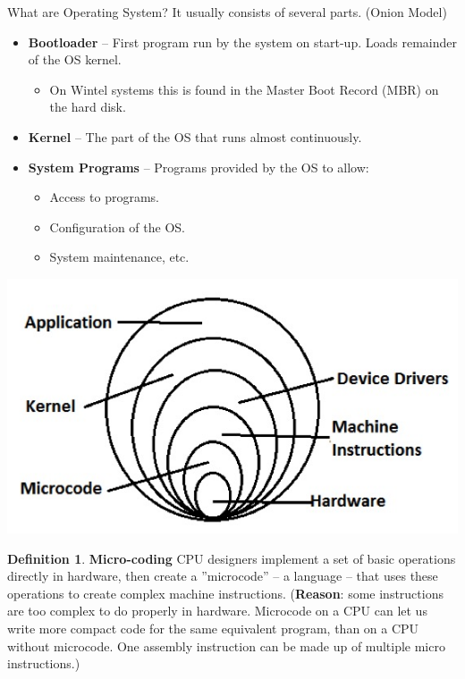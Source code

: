 \documentclass[11pt,a4paper]{article}
\theoremstyle{definition}
\newtheorem{definition}{Definition}[section]
\newenvironment{myitemize}
{ \begin{itemize}
    \setlength{\itemsep}{5pt}
    \setlength{\parskip}{0pt}
    \setlength{\parsep}{0pt}     }
{ \end{itemize}                  }
\begin{document}
\begin{tcolorbox}
	\textsf{What are Operating System?} It usually consists of several parts. (\textsf{Onion Model})
	
	\begin{myitemize}
		\item \textbf{Bootloader} – First program run by the system on start-up. Loads remainder of the OS kernel. 
		\begin{myitemize}
			\item On Wintel systems this is found in the Master Boot Record (MBR) on the hard disk.
		\end{myitemize}
		\item \textbf{Kernel} – The part of the OS that runs almost continuously. 
		\item \textbf{System Programs} – Programs provided by the OS to allow:
		\begin{myitemize}
		\item Access to programs.
		\item Configuration of the OS.
		\item System maintenance, etc.
		\end{myitemize}
	\end{myitemize}
		\includegraphics[scale=0.5]{m1/onionModel}
		\centering
\end{tcolorbox}

\begin{definition}{\textbf{Micro-coding}}
	CPU designers implement a set of basic operations directly in hardware, then create a ''microcode'' – a language – that uses these operations to create complex machine instructions. (\textbf{Reason}: some instructions are too complex to do properly in hardware. Microcode on a CPU can let us write more compact code for the same equivalent program, than on a CPU without microcode. One assembly instruction can be made up of multiple micro instructions.)
\end{definition}
\end{document}
